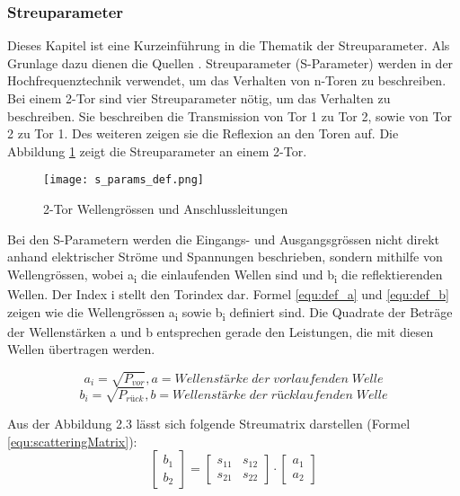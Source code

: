 \subsubsection{Streuparameter}\label{subsubsec:streuparameter}
Dieses Kapitel ist eine Kurzeinführung in die Thematik der Streuparameter. Als Grunlage dazu dienen die Quellen \cite{hftech}\cite{Bernstein2015}. Streuparameter (S-Parameter) werden in der Hochfrequenztechnik verwendet, um das Verhalten von n-Toren zu beschreiben. Bei einem 2-Tor sind vier Streuparameter nötig, um das Verhalten zu beschreiben. Sie beschreiben die Transmission von Tor 1 zu Tor 2, sowie von Tor 2 zu Tor 1. Des weiteren zeigen sie die Reflexion an den Toren auf. Die Abbildung \ref{fig:2-Tor} zeigt die Streuparameter an einem 2-Tor. 


\begin{figure}[H]
	\centering
	\texttt{[image: s\_params\_def.png]}
	\caption{2-Tor Wellengrössen und Anschlussleitungen \cite{hftech}}
	\label{fig:2-Tor}
\end{figure}

Bei den S-Parametern werden die Eingangs- und Ausgangsgrössen nicht direkt anhand elektrischer Ströme und Spannungen beschrieben, sondern mithilfe von Wellengrössen, wobei a\textsubscript{i} die einlaufenden Wellen sind und b\textsubscript{i} die reflektierenden Wellen. Der Index i stellt den Torindex dar. Formel \ref{equ:def_a} und \ref{equ:def_b} zeigen wie die Wellengrössen a\textsubscript{i} sowie b\textsubscript{i} definiert sind. Die Quadrate der Beträge der Wellenstärken a und b entsprechen gerade den Leistungen, die mit diesen Wellen übertragen werden.

\begin{equation}\label{equ:def_a}
	a_{ i } = \sqrt{ P_{ vor } }, a = Wellenstärke\;der\;vorlaufenden\;Welle
\end{equation}
\begin{equation}\label{equ:def_b}
	b_{ i } = \sqrt{ P_{ rück } }, b = Wellenstärke\;der\;rücklaufenden\;Welle
\end{equation}

Aus der Abbildung 2.3 lässt sich folgende Streumatrix darstellen (Formel \ref{equ:scatteringMatrix}):
\begin{equation}\label{equ:scatteringMatrix}
	\left[
		\begin{matrix}b_1 \\ b_2 \end{matrix}
	\right]
 	=
 	\left[
 		\begin{matrix}
			s_{11}&s_{12} \\s_{21}&s_{22}
		\end{matrix}
	\right]
	\cdot 
	\left[
		\begin{matrix}
			a_1\\a_2
		\end{matrix}
	\right]
\end{equation}

